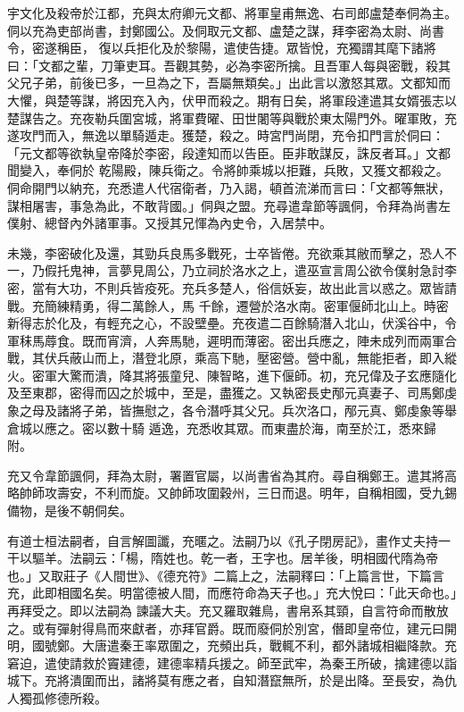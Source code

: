 \begin{pinyinscope}
 宇文化及殺帝於江都，充與太府卿元文都、將軍皇甫無逸、右司郎盧楚奉侗為主。侗以充為吏部尚書，封鄭國公。及侗取元文都、盧楚之謀，拜李密為太尉、尚書令，密遂稱臣，
 復以兵拒化及於黎陽，遣使告捷。眾皆悅，充獨謂其麾下諸將曰：「文都之輩，刀筆吏耳。吾觀其勢，必為李密所擒。且吾軍人每與密戰，殺其父兄子弟，前後已多，一旦為之下，吾屬無類矣。」出此言以激怒其眾。文都知而大懼，與楚等謀，將因充入內，伏甲而殺之。期有日矣，將軍段達遣其女婿張志以楚謀告之。充夜勒兵圍宮城，將軍費曜、田世闍等與戰於東太陽門外。曜軍敗，充遂攻門而入，無逸以單騎遁走。獲楚，殺之。時宮門尚閉，充令扣門言於侗曰：「元文都等欲執皇帝降於李密，段達知而以告臣。臣非敢謀反，誅反者耳。」文都聞變入，奉侗於
 乾陽殿，陳兵衛之。令將帥乘城以拒難，兵敗，又獲文都殺之。侗命開門以納充，充悉遣人代宿衛者，乃入謁，頓首流涕而言曰：「文都等無狀，謀相屠害，事急為此，不敢背國。」侗與之盟。充尋遣韋節等諷侗，令拜為尚書左僕射、總督內外諸軍事。又授其兄惲為內史令，入居禁中。



 未幾，李密破化及還，其勁兵良馬多戰死，士卒皆倦。充欲乘其敝而擊之，恐人不一，乃假托鬼神，言夢見周公，乃立祠於洛水之上，遣巫宣言周公欲令僕射急討李密，當有大功，不則兵皆疫死。充兵多楚人，俗信妖妄，故出此言以惑之。眾皆請戰。充簡練精勇，得二萬餘人，馬
 千餘，遷營於洛水南。密軍偃師北山上。時密新得志於化及，有輕充之心，不設壁壘。充夜遣二百餘騎潛入北山，伏溪谷中，令軍秣馬蓐食。既而宵濟，人奔馬馳，遲明而薄密。密出兵應之，陣未成列而兩軍合戰，其伏兵蔽山而上，潛登北原，乘高下馳，壓密營。營中亂，無能拒者，即入縱火。密軍大驚而潰，降其將張童兒、陳智略，進下偃師。初，充兄偉及子玄應隨化及至東郡，密得而囚之於城中，至是，盡獲之。又執密長史邴元真妻子、司馬鄭虔象之母及諸將子弟，皆撫慰之，各令潛呼其父兄。兵次洛口，邴元真、鄭虔象等舉倉城以應之。密以數十騎
 遁逸，充悉收其眾。而東盡於海，南至於江，悉來歸附。



 充又令韋節諷侗，拜為太尉，署置官屬，以尚書省為其府。尋自稱鄭王。遣其將高略帥師攻壽安，不利而旋。又帥師攻圍穀州，三日而退。明年，自稱相國，受九錫備物，是後不朝侗矣。



 有道士桓法嗣者，自言解圖讖，充暱之。法嗣乃以《孔子閉房記》，畫作丈夫持一干以驅羊。法嗣云：「楊，隋姓也。乾一者，王字也。居羊後，明相國代隋為帝也。」又取莊子《人間世》、《德充符》二篇上之，法嗣釋曰：「上篇言世，下篇言充，此即相國名矣。明當德被人間，而應符命為天子也。」充大悅曰：「此天命也。」再拜受之。即以法嗣為
 諫議大夫。充又羅取雜鳥，書帛系其頸，自言符命而散放之。或有彈射得鳥而來獻者，亦拜官爵。既而廢侗於別宮，僭即皇帝位，建元曰開明，國號鄭。大唐遣秦王率眾圍之，充頻出兵，戰輒不利，都外諸城相繼降款。充窘迫，遣使請救於竇建德，建德率精兵援之。師至武牢，為秦王所破，擒建德以詣城下。充將潰圍而出，諸將莫有應之者，自知潛竄無所，於是出降。至長安，為仇人獨孤修德所殺。




\end{pinyinscope}
